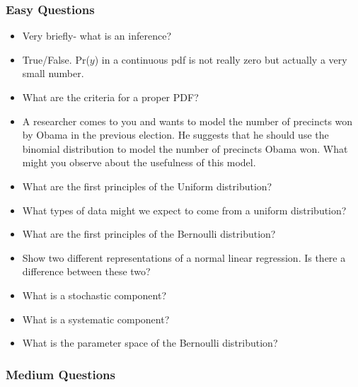 \documentclass[11pt]{article}
\begin{document}
\subsubsection{Easy Questions}
\begin{itemize}
\item Very briefly- what is an inference?
\item True/False. Pr($y$) in a continuous pdf is not really zero but actually a very small number.
\item What are the criteria for a proper PDF?
\item A researcher comes to you and wants to model the number of precincts won by Obama in the previous election.  He suggests that he should use the binomial distribution to model the number of precincts Obama won.  What might you observe about the usefulness of this model.
\item What are the first principles of the Uniform distribution?
\item What types of data might we expect to come from a uniform distribution?
\item What are the first principles of the Bernoulli distribution?
\item Show two different representations of a normal linear regression.  Is there a difference between these two?
\item What is a stochastic component?
\item What is a systematic component?
\item What is the parameter space of the Bernoulli distribution?
\end{itemize}

\subsubsection{Medium Questions}
\end{document}
